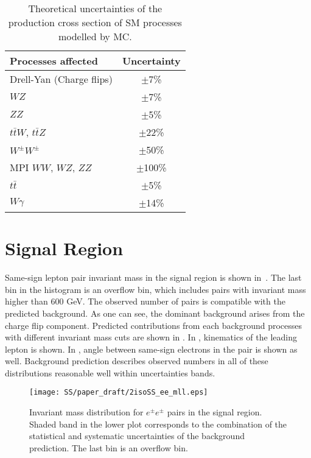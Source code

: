 \begin{table}[ht]
\begin{center}
\begin{tabular}{l|c}
Processes affected & Uncertainty \\
\hline
 Drell-Yan (Charge flips) & $\pm$7\% \\
 $WZ$ & $\pm$7\% \\
 $ZZ$ & $\pm$5\% \\
 $t\bar{t}W$, $t\bar{t}Z$  & $\pm$22\% \\
 $W^{\pm}W^{\pm}$ & $\pm$50\% \\
 MPI $WW$, $WZ$, $ZZ$ & $\pm$100\% \\
 $t\bar{t}$ & $\pm$5\% \\
 $W\gamma$ & $\pm$14\% \\
\end{tabular}
\end{center}
\caption{Theoretical uncertainties of the production cross section of SM processes modelled by MC.}
\label{tab:systematics_common}
\end{table}



\section{Signal Region}
\label{sec:ss_signalRegion}

Same-sign lepton pair invariant mass in the signal region is shown in~.
The last bin in the histogram is an overflow bin, which includes pairs with invariant mass higher than 600 GeV.
The observed number of pairs is compatible with the predicted background.
As one can see, the dominant background arises from the charge flip component.
Predicted contributions from each background processes with different invariant mass cuts are shown in .
In , kinematics of the leading lepton is shown. 
In , angle between same-sign electrons in the pair is shown as well.
Background prediction describes observed numbers in all of these distributions reasonable well within uncertainties bands.

\begin{figure}[h]
\begin{center}
\texttt{[image: SS/paper\_draft/2isoSS\_ee\_mll.eps]}
\caption{Invariant mass distribution for $e^{\pm}e^{\pm}$ pairs in the signal region. 
Shaded band in the lower plot corresponds to the combination of the statistical and systematic uncertainties of the background prediction.
The last bin is an overflow bin.}
\label{fig:signal_mass}
\end{center}
\end{figure}

